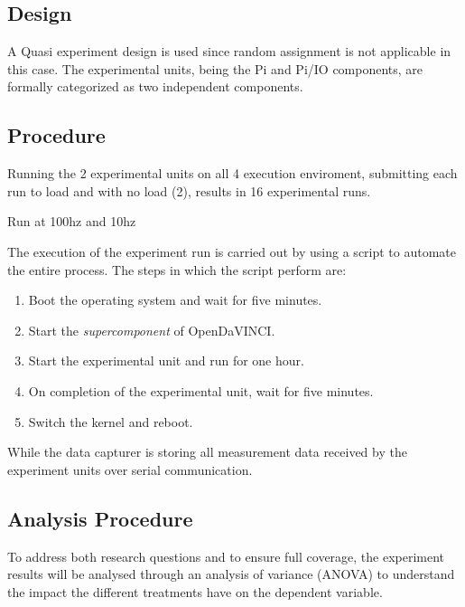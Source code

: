 \subsection{Design}
A Quasi experiment design is used since random assignment is not applicable in this case. The experimental units, being the Pi and Pi/IO components, are formally categorized as two independent components. 



\subsection{Procedure}

Running the 2 experimental units on all 4 execution enviroment, submitting each run to load and with no load (2), results in 16 experimental runs. 

Run at 100hz and 10hz 



The execution of the experiment run is carried out by using a script to automate the entire process. The steps in which the script perform are:\\

\begin{enumerate}  
\item Boot the operating system and wait for five minutes.  
\item Start the \textit{supercomponent} of OpenDaVINCI.
\item Start the experimental unit and run for one hour.
\item On completion of the experimental unit, wait for five minutes.
\item Switch the kernel and reboot.\\ 
\end{enumerate}

While the data capturer is storing all measurement data received by the experiment units over serial communication. 

\subsection{Analysis Procedure}
To address both research questions and to ensure full coverage, the experiment results will be analysed through an analysis of variance (ANOVA) to understand the impact the different treatments have on the dependent variable.\\










